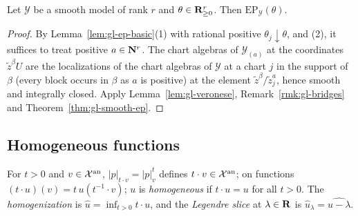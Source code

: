\begin{corollary}\label{cor:gl-smooth-ep-nef}
\leanok
{}
Let $\mathcal Y$ be a smooth model of rank $r$ and $\theta\in\mathbf{R}^r_{\ge0}$. Then $\mathrm{EP}_{\mathcal Y}(\theta)$.
\end{corollary}

\begin{proof}
By Lemma~\ref{lem:gl-ep-basic}(1) with rational positive $\theta_j\downarrow\theta$, and (2), it suffices to treat positive $a\in\mathbf{N}^r$. The chart algebras of
$\mathcal Y_{(a)}$ at the coordinates $\tilde z^\beta U$ are the localizations of the chart algebras of $\mathcal Y$ at a chart $j$ in the support of $\beta$ (every
block occurs in $\beta$ as $a$ is positive) at the element $\tilde z^\beta/\tilde z_j^a$, hence smooth and integrally closed. Apply
Lemma~\ref{lem:gl-veronese}, Remark~\ref{rmk:gl-bridges} and Theorem~\ref{thm:gl-smooth-ep}.
\end{proof}

\subsection{Homogeneous functions}\label{subsec:gl-homogeneous}

\begin{definition}\label{def:gl-scaling}
\leanok
{}
For $t>0$ and $v\in\mathcal X^{\mathrm{an}}$, $|p|_{t\cdot v}=|p|_v^t$ defines $t\cdot v\in\mathcal X^{\mathrm{an}}$; on functions $(t\cdot u)(v)=t\,u(t^{-1}\cdot v)$; $u$ is
\emph{homogeneous} if $t\cdot u=u$ for all $t>0$. The \emph{homogenization} is $\hat u=\inf_{t>0}t\cdot u$, and the \emph{Legendre slice} at
$\lambda\in\mathbf{R}$ is $\hat u_\lambda=\widehat{u-\lambda}$.
\end{definition}

